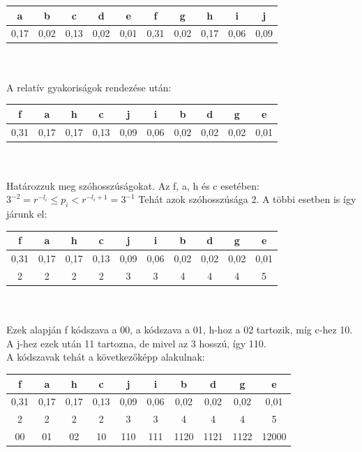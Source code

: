 \documentclass[12pt,margin=0px]{article}
\begin{document}
    \begin{tabular}{|c|c|c|c|c|c|c|c|c|c|}
        \hline a & b & c & d & e & f & g & h & i & j \\
        \hline 0,17 & 0,02 & 0,13 & 0,02 & 0,01 & 0,31 & 0,02 & 0,17 & 0,06 & 0,09 \\
        \hline
    \end{tabular}\\\\

    \noindent A relatív gyakoriságok rendezése után:\\

    \begin{tabular}{|c|c|c|c|c|c|c|c|c|c|}
        \hline f & a & h & c & j & i & b & d & g & e \\
        \hline 0,31 & 0,17 & 0,17 & 0,13 & 0,09 & 0,06 & 0,02 & 0,02 & 0,02 & 0,01 \\
        \hline
    \end{tabular}\\\\

    \noindent Határozzuk meg szóhosszúságokat. Az f, a, h és c esetében: $3^{-2} = r^{-l_i} \leq p_i < r^{-l_i+1} = 3^{-1} $ Tehát azok szóhosszúsága 2. A többi esetben is így járunk el:\\

    \begin{tabular}{|c|c|c|c|c|c|c|c|c|c|}
        \hline f & a & h & c & j & i & b & d & g & e \\
        \hline 0,31 & 0,17 & 0,17 & 0,13 & 0,09 & 0,06 & 0,02 & 0,02 & 0,02 & 0,01 \\
        \hline 2 & 2 & 2 & 2 & 3 & 3 & 4 & 4 & 4  & 5 \\
        \hline
    \end{tabular}\\\\

    \noindent Ezek alapján f kódszava a 00, a kódszava a 01, h-hoz a 02 tartozik, míg c-hez 10. A j-hez ezek után 11 tartozna, de mivel az 3 hosszú, így 110.\\

    \noindent A kódszavak tehát a következőképp alakulnak:\\

    \begin{tabular}{|c|c|c|c|c|c|c|c|c|c|}
        \hline f & a & h & c & j & i & b & d & g & e \\
        \hline 0,31 & 0,17 & 0,17 & 0,13 & 0,09 & 0,06 & 0,02 & 0,02 & 0,02 & 0,01 \\
        \hline 2 & 2 & 2 & 2 & 3 & 3 & 4 & 4 & 4  & 5 \\
        \hline 00 & 01 & 02 & 10 & 110 & 111 & 1120 & 1121 & 1122 & 12000 \\
        \hline
    \end{tabular} \\\\
\end{document}
